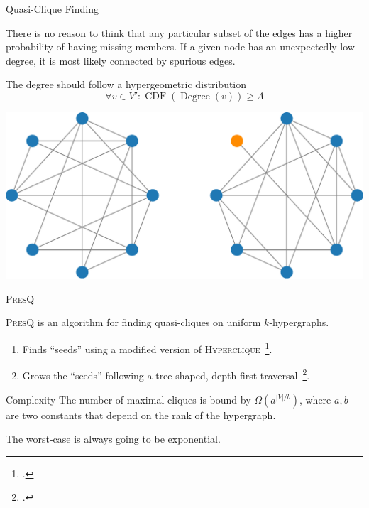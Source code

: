 \documentclass[10pt,compress]{beamer}
\newcommand{\PresQ}[0]{\textsc{PresQ}\xspace}
\begin{document}
\begin{frame}{Quasi-Clique Finding}
    \begin{block}{}
    There is no reason to think that any particular subset of the edges
    has a higher probability of having missing members. If a given node has an
    unexpectedly low degree, it is most likely connected by spurious edges.
    \end{block}
    \begin{block}{The degree should follow a hypergeometric distribution}
    \begin{equation}
        \forall v \in V': \operatorname{CDF}(\operatorname{Degree}(v)) \ge \Lambda
    \end{equation}
    \end{block}
    \centering
    \includegraphics[width=0.6\linewidth]{quasicliques}

\end{frame}

\begin{frame}{\PresQ}

    \begin{block}{}
    \PresQ is an algorithm for finding quasi-cliques on uniform
    $k$-hypergraphs.
    
    \begin{enumerate}
        \item Finds ``seeds'' using a modified version of \textsc{Hyperclique}~\footcite{koeller2003discovery}.
        \item Grows the ``seeds'' following a tree-shaped, depth-first
        traversal~\footcite{uno_efficient_2010}.
    \end{enumerate}
    \end{block}
    
    \begin{alertblock}{Complexity}
        \smallskip
        The number of maximal cliques is bound by $\Omega(a^{|V|/b})$,
        where $a, b$ are two constants that depend on the rank of the hypergraph.
        
        The worst-case is always going to be exponential.
    \end{alertblock}

\end{frame}
\end{document}
